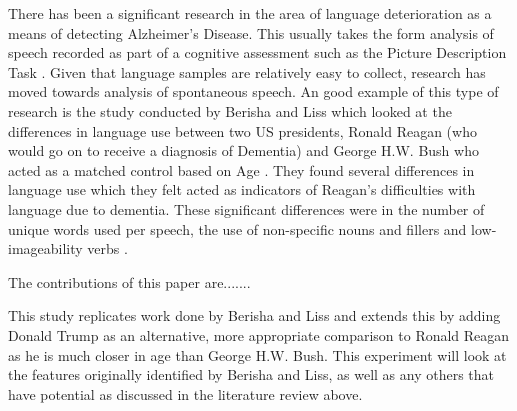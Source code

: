 \documentclass[10pt]{article}
\begin{document}
\par 
There has been a significant research in the area of language deterioration as a means of detecting Alzheimer's Disease. This usually takes the form analysis of speech recorded as part of a cognitive assessment such as the Picture Description Task \cite{Orimaye2014,Fraser2015}. Given that language samples are relatively easy to collect, research has moved towards analysis of spontaneous speech. An good example of this type of research is the study conducted by Berisha and Liss which looked at the differences in language use between two US presidents, Ronald Reagan (who would go on to receive a diagnosis of Dementia) and George H.W. Bush who acted as a matched control based on Age \cite{Berisha2015}. They found several differences in language use which they felt acted as indicators of Reagan's difficulties with language due to dementia. These significant differences were in the number of unique words used per speech, the use of non-specific nouns and fillers and low-imageability verbs \cite{Berisha2015}. 
\par  

The contributions of this paper are.......

\par 
This study replicates work done by Berisha and Liss and extends this by adding Donald Trump as an alternative, more appropriate comparison to Ronald Reagan as he is much closer in age than George H.W. Bush. This experiment will look at the features originally identified by Berisha and Liss, as well as any others that have potential as discussed in the literature review above. 
\end{document}
